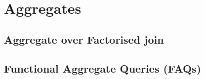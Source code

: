 \chapter{Aggregates}



\section{Aggregate over Factorised join}




\section{Functional Aggregate Queries (FAQs)}











 
